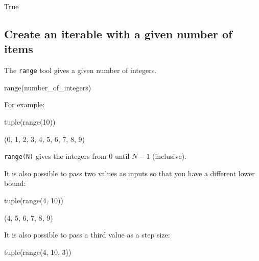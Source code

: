 \begin{raw}
True
\end{raw}





\subsection{Create an iterable with a given number of items}
\label{\detokenize{tools-for-mathematics/05-combinations-permutations/how/main:creating-an-iterable-with-a-given-number-of-items}}\label{\detokenize{tools-for-mathematics/05-combinations-permutations/how/main:id4}}

The \texttt{range} tool gives a given number of integers.


\begin{api}
range(number_of_integers)
\end{api}



For example:




\begin{pyin}
tuple(range(10))
\end{pyin}





\begin{raw}
(0, 1, 2, 3, 4, 5, 6, 7, 8, 9)
\end{raw}






\texttt{range(N)} gives the integers from 0 until \(N - 1\) (inclusive).



It is also possible to pass two values as inputs so that you have a different lower bound:




\begin{api}
tuple(range(4, 10))
\end{api}





\begin{raw}
(4, 5, 6, 7, 8, 9)
\end{raw}





It is also possible to pass a third value as a step size:




\begin{pyin}
tuple(range(4, 10, 3))
\end{pyin}





